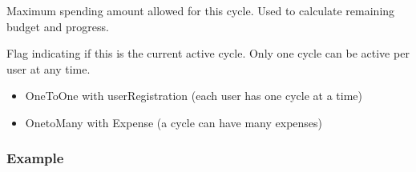 \documentclass[letterpaper,10pt,english]{sphinxmanual}
\begin{document}
\begin{fulllineitems}
\begin{fulllineitems}
\end{fulllineitems}


\begin{fulllineitems}
\label{\detokenize{expensesApp:expensesApp.models.Cycle.total_allowance}}
\pysigstartsignatures
\pysigline
{}
\pysigstopsignatures
\sphinxAtStartPar
Maximum spending amount allowed for this cycle.
Used to calculate remaining budget and progress.

\end{fulllineitems}


\begin{fulllineitems}
\label{\detokenize{expensesApp:expensesApp.models.Cycle.is_active}}
\pysigstartsignatures
\pysigline
{}
\pysigstopsignatures
\sphinxAtStartPar
Flag indicating if this is the current active cycle.
Only one cycle can be active per user at any time.

\end{fulllineitems}

\begin{description}
\begin{itemize}
\item {} 
\sphinxAtStartPar
OneToOne with userRegistration (each user has one cycle at a time)

\item {} 
\sphinxAtStartPar
One\sphinxhyphen{}to\sphinxhyphen{}Many with Expense (a cycle can have many expenses)

\end{itemize}

\end{description}
\subsubsection*{Example}


\end{fulllineitems}
\end{document}
